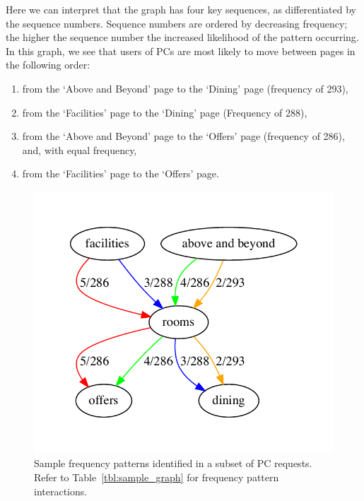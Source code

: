 \documentclass[12pt,titlepage]{article}
\begin{document}
Here we can interpret that the graph has four key sequences, as differentiated by the sequence numbers. Sequence numbers are ordered by decreasing frequency; the higher the sequence number the increased likelihood of the pattern occurring. In this graph, we see that users of PCs are most likely to move between pages in the following order:

\begin{enumerate}
  \item from the `Above and Beyond' page to the `Dining' page (frequency of 293),
  \item from the `Facilities' page to the `Dining' page (Frequency of 288),
  \item from the `Above and Beyond' page to the `Offers' page (frequency of 286), and, with equal frequency,
  \item from the `Facilities' page to the `Offers' page.
\end{enumerate} 

\newpage


\begin{figure}[b!]
  \centering
  \includegraphics{figs/digraphs/sample_graph}
  \caption{Sample frequency patterns identified in a subset of PC requests. Refer to Table~\ref{tbl:sample_graph} for frequency pattern interactions.}
  \label{fig:sample_graph}
\end{figure}
\end{document}
